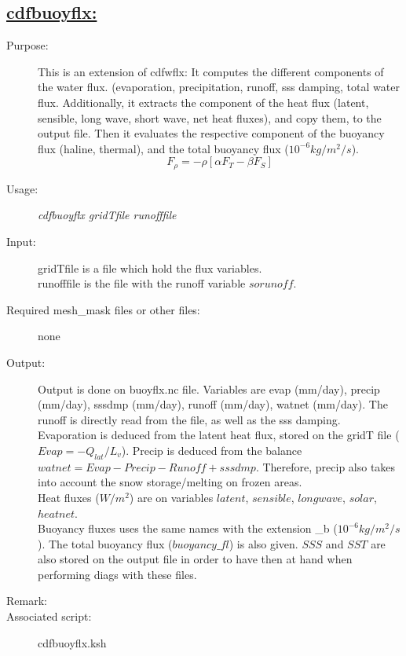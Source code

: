 \documentclass[a4paper,11pt]{article}
\begin{document}
\subsection*{\underline{cdfbuoyflx:}}
\begin{description}
\item[Purpose:] This is an extension of cdfwflx: It computes the different components of 
  the water flux. (evaporation, precipitation, runoff, sss damping, total water flux. Additionally, it extracts the component
  of the heat flux (latent, sensible, long wave, short wave, net heat fluxes), and copy them, to the output file. Then it
  evaluates the respective component of the buoyancy flux (haline, thermal), and the total buoyancy flux ($10^{-6} kg/m^2/s$).\\
    \[ F_{\rho} = - \rho \left [ \alpha F_T - \beta F_S \right ] \]
\item[Usage:] {\em cdfbuoyflx gridTfile runofffile}
\item[Input:] gridTfile is a file which hold the flux variables.\\
              runofffile is the file with the runoff variable $sorunoff$.
\item[Required mesh\_mask files or other files:]  none
\item[Output:] Output is done on buoyflx.nc file. Variables are evap (mm/day), precip (mm/day), sssdmp (mm/day), runoff (mm/day),
     watnet (mm/day). The runoff is directly read from the file, as well as the sss damping. Evaporation is deduced from the
     latent heat flux, stored on the gridT file ($Evap=-Q_{lat}/L_v$). Precip is deduced from the balance 
    $watnet=Evap -Precip -Runoff +sssdmp$. Therefore, precip also takes into account the snow storage/melting on frozen areas. \\
    Heat fluxes ($W/m^2$) are on variables $latent$, $sensible$, $longwave$, $solar$, $heatnet$. \\
    Buoyancy fluxes uses the same names with the extension \_b ($10^{-6} kg/m^2/s$ ).
    The total buoyancy flux ($buoyancy\_fl$) is also given. $SSS$ and $SST$ are also stored on the output file in order to 
    have then at hand when performing diags with these files.

\item[Remark:] 
\item[Associated script:] cdfbuoyflx.ksh
\end{description}
\end{document}
